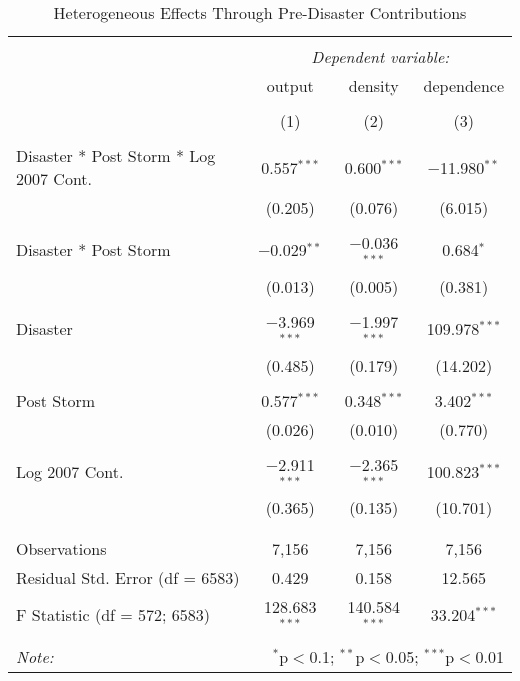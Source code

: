 
\begin{table}[!htbp] \centering 
  \caption{Heterogeneous Effects Through Pre-Disaster Contributions} 
  \label{} 
\small 
\begin{tabular}{@{\extracolsep{5pt}}lccc} 
\\[-1.8ex]\hline 
\hline \\[-1.8ex] 
 & \multicolumn{3}{c}{\textit{Dependent variable:}} \\ 
\cline{2-4} 
 & output & density & dependence \\ 
\\[-1.8ex] & (1) & (2) & (3)\\ 
\hline \\[-1.8ex] 
 Disaster * Post Storm * Log 2007 Cont. & 0.557$^{***}$ & 0.600$^{***}$ & $-$11.980$^{**}$ \\ 
  & (0.205) & (0.076) & (6.015) \\ 
  & & & \\ 
 Disaster * Post Storm & $-$0.029$^{**}$ & $-$0.036$^{***}$ & 0.684$^{*}$ \\ 
  & (0.013) & (0.005) & (0.381) \\ 
  & & & \\ 
 Disaster & $-$3.969$^{***}$ & $-$1.997$^{***}$ & 109.978$^{***}$ \\ 
  & (0.485) & (0.179) & (14.202) \\ 
  & & & \\ 
 Post Storm & 0.577$^{***}$ & 0.348$^{***}$ & 3.402$^{***}$ \\ 
  & (0.026) & (0.010) & (0.770) \\ 
  & & & \\ 
 Log 2007 Cont. & $-$2.911$^{***}$ & $-$2.365$^{***}$ & 100.823$^{***}$ \\ 
  & (0.365) & (0.135) & (10.701) \\ 
  & & & \\ 
\hline \\[-1.8ex] 
Observations & 7,156 & 7,156 & 7,156 \\ 
Residual Std. Error (df = 6583) & 0.429 & 0.158 & 12.565 \\ 
F Statistic (df = 572; 6583) & 128.683$^{***}$ & 140.584$^{***}$ & 33.204$^{***}$ \\ 
\hline 
\hline \\[-1.8ex] 
\textit{Note:}  & \multicolumn{3}{r}{$^{*}$p$<$0.1; $^{**}$p$<$0.05; $^{***}$p$<$0.01} \\ 
\end{tabular} 
\end{table} 
